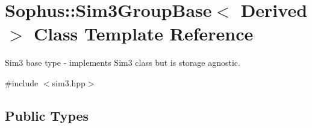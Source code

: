 \hypertarget{class_sophus_1_1_sim3_group_base}{}\section{Sophus\+:\+:Sim3\+Group\+Base$<$ Derived $>$ Class Template Reference}
\label{class_sophus_1_1_sim3_group_base}


Sim3 base type -\/ implements Sim3 class but is storage agnostic.  




{\ttfamily \#include $<$sim3.\+hpp$>$}

\subsection*{Public Types}
